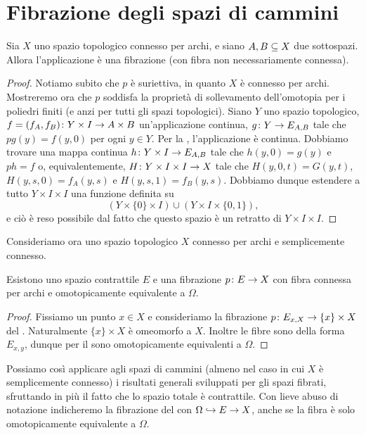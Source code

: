 \section{Fibrazione degli spazi di cammini}
\begin{theorem}
Sia \(X\) uno spazio topologico connesso per archi, e siano \(A,B\subseteq X\) due sottospazi. Allora l'applicazione
è una fibrazione (con fibra non necessariamente connessa).
\end{theorem}
\begin{proof}
Notiamo subito che \(p\) è suriettiva, in quanto \(X\) è connesso per archi. Mostreremo ora che \(p\) soddisfa la proprietà di sollevamento dell'omotopia per i poliedri finiti (e anzi per tutti gli spazi topologici). Siano \(Y\) uno spazio topologico, \(\map{f=(f_A,f_B)}{Y\times I}{A\times B}\) un'applicazione continua, \(\map{g}{Y}{E_{A,B}}\) tale che \(pg(y)=f(y,0)\) per ogni \(y\in Y\). Per la , l'applicazione
è continua. Dobbiamo trovare una mappa continua \(\map{h}{Y\times I}{E_{A,B}}\) tale che \(h(y,0)=g(y)\) e \(ph=f\) o, equivalentemente, \(\map{H}{Y\times I\times I}{X}\) tale che \(H(y,0,t)=G(y,t)\), \(H(y,s,0)=f_A(y,s)\) e \(H(y,s,1)=f_B(y,s)\). Dobbiamo dunque estendere a tutto \(Y\times I\times I\) una funzione definita su
\[
(Y\times\{0\}\times I)\cup(Y\times I\times \{0,1\}),
\]
e ciò è reso possibile dal fatto che questo spazio è un retratto di \(Y\times I\times I\).
\end{proof}

Consideriamo ora uno spazio topologico \(X\) connesso per archi e semplicemente connesso.

\begin{corollary}
Esistono uno spazio contrattile \(E\) e una fibrazione \(\map{p}{E}{X}\) con fibra connessa per archi e omotopicamente equivalente a \(\Omega\).
\end{corollary}
\begin{proof}
Fissiamo un punto \(x\in X\) e consideriamo la fibrazione \(\map{p}{E_{x,X}}{\{x\}\times X}\) del . Naturalmente \(\{x\}\times X\) è omeomorfo a \(X\). Inoltre le fibre sono della forma \(E_{x,y}\), dunque per il  sono omotopicamente equivalenti a \(\Omega\).
\end{proof}

Possiamo così applicare agli spazi di cammini (almeno nel caso in cui \(X\) è semplicemente connesso) i risultati generali sviluppati per gli spazi fibrati, sfruttando in più il fatto che lo spazio totale è contrattile. Con lieve abuso di notazione indicheremo la fibrazione del  con \(\Omega\hookrightarrow E\to X\), anche se la fibra è solo omotopicamente equivalente a \(\Omega\).

